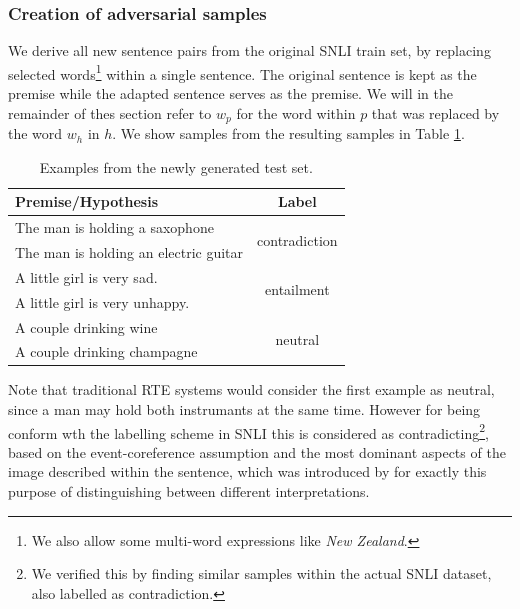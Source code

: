 \subsubsection{Creation of adversarial samples}
We derive all new sentence pairs from the original \ac{SNLI} train set, by replacing selected words\footnote{We also allow some multi-word expressions like \textit{New Zealand}.} within a single sentence. The original sentence is kept as the premise while the adapted sentence serves as the premise. We will in the remainder of thes section refer to $w_p$ for the word within $p$ that was replaced by the word $w_h$ in $h$. We show samples from the resulting samples in Table \ref{tab:new_testset_samples}.
\begin{table}[htt]
\centering
\begin{tabular}{lc}
\toprule
	\textbf{Premise/Hypothesis} & \textbf{Label} \\  \midrule
		The man is holding a saxophone & \multirow{2}{*}{contradiction} \\
        The man is holding an electric guitar & \\
        \midrule
		A little girl is very sad. & \multirow{2}{*}{entailment} \\ 
        A little girl is very unhappy.&  \\
        \midrule
		A couple drinking wine & \multirow{2}{*}{neutral} \\
        A couple drinking champagne &  \\
    \bottomrule
  \end{tabular}
  \label{tab:new_testset_samples}
  \caption{Examples from the newly generated test set.}
\end{table}
Note that traditional \ac{RTE} systems would consider the first example as neutral, since a man may hold both instrumants at the same time. However for being conform wth the labelling scheme in \ac{SNLI} this is considered as contradicting\footnote{We verified this by finding similar samples within the actual \ac{SNLI} dataset, also labelled as contradiction.}, based on the event-coreference assumption and the most dominant aspects of the image described within the sentence, which was introduced by \cite{bowman2015large} for exactly this purpose of distinguishing between different interpretations.

